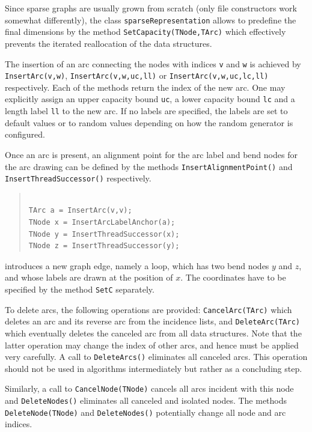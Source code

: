 \documentclass[a4paper,11pt,twoside]{book}
\begin{document}
\begin{multicols}{2}
Since sparse graphs are usually grown from scratch (only file constructors work
somewhat differently), the class \verb/sparseRepresentation/ allows to predefine
the final dimensions by the method \verb/SetCapacity(TNode,TArc)/ which effectively
prevents the iterated reallocation of the data structures.

The insertion of an arc connecting the nodes with indices \verb/v/ and \verb/w/
is achieved by \verb/InsertArc(v,w)/, \verb/InsertArc(v,w,uc,ll)/ or
\verb/InsertArc(v,w,uc,lc,ll)/ respectively. Each of the methods return the
index of the new arc. One may explicitly assign an upper capacity bound
\verb/uc/, a lower capacity bound \verb/lc/ and a length label \verb/ll/ to
the new arc. If no labels are specified, the labels are set to default values
or to random values depending on how the random generator is configured.

Once an arc is present, an alignment point for the arc label and bend nodes
for the arc drawing can be defined by the methods \verb/InsertAlignmentPoint()/
and \verb/InsertThreadSuccessor()/ respectively.
\sample
\begin{quote}
\begin{verbatim}

TArc a = InsertArc(v,v);
TNode x = InsertArcLabelAnchor(a);
TNode y = InsertThreadSuccessor(x);
TNode z = InsertThreadSuccessor(y);

\end{verbatim}
\end{quote}
introduces a new graph edge, namely a loop, which has two bend nodes $y$ and
$z$, and whose labels are drawn at the position of $x$. The coordinates have
to be specified by the method \verb/SetC/ separately.

To delete arcs, the following operations are provided: \verb/CancelArc(TArc)/
which deletes an arc and its reverse arc from the incidence lists, and
\verb/DeleteArc(TArc)/ which eventually deletes the canceled arc from all data
structures. Note that the latter operation may change the index of other arcs,
and hence must be applied very carefully. A call to \verb/DeleteArcs()/
eliminates all canceled arcs. This operation should not be used in algorithms
intermediately but rather as a concluding step.

Similarly, a call to \verb/CancelNode(TNode)/ cancels all arcs incident with
this node and \verb/DeleteNodes()/ eliminates all canceled and isolated nodes.
The methods \verb/DeleteNode(TNode)/ and \verb/DeleteNodes()/ potentially
change all node and arc indices.


\end{multicols}
\end{document}
